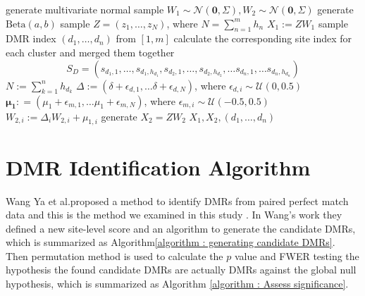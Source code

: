 \documentclass{report}
\begin{document}
\begin{algorithm}
\begin{algorithmic}[1]
           \State generate multivariate normal sample $W_1 \sim \mathcal{N}( \mathbf{0}, \Sigma), W_2 \sim \mathcal{N}(\mathbf{0}, \Sigma)$
           \State generate $\mathrm{Beta}(a,b)$ sample $Z = (z_1, \ldots, z_{N})$, where $N = \sum_{n=1}^m h_n$
           \State $X_1 := Z W_1$ 
           \State sample DMR index $(d_1, \ldots, d_n)$ from $[1,m]$
           \State calculate the corresponding site index for each cluster and merged them together
            \[ 
             S_D = (s_{d_1,1}, \ldots, s_{d_1, h_{d_1}}, s_{d_2,1}, \ldots, s_{d_2, h_{d_2}} ,\ldots s_{d_n,1}, \ldots s_{d_n, h_{d_n}} )
             \]
            \State $N := \sum_{k=1}^n h_{d_k}$ 
            \State $\Delta := (\delta + \epsilon_{d,1}, \ldots \delta + \epsilon_{d,N})$, 
             where $\epsilon_{d,i} \sim \mathcal{U}(0,0.5)$ 
            \State $\boldsymbol{\mu_1} : = (\mu_1 + \epsilon_{m,1}, \ldots \mu_1 + \epsilon_{m,N})$, 
            where $\epsilon_{m,i} \sim \mathcal{U}(-0.5,0.5)$ 
           \State $W_{2,i} := \Delta_i W_{2,i} + \mu_{1,i}$  
            \EndFor
            \State generate $X_2 = Z W_2$
       \State \Return $X_1, X_2, (d_1,\ldots,d_n)$
       \end{algorithmic}
   \end{algorithm}
   
   \section{DMR Identification Algorithm }
    \par
   Wang Ya et al.proposed a method to identify DMRs from paired perfect match data and this is the method we examined in this study \cite{wang2017accounting}.
   In Wang's work they defined a new site-level score and an algorithm to generate the candidate DMRs, which is summarized as Algorithm\ref{algorithm : generating candidate DMRs}.  Then permutation method is used to calculate
   the $p$ value and FWER testing the hypothesis the found candidate DMRs are actually DMRs against the global null hypothesis, which is summarized as Algorithm \ref{algorithm : Assess significance}.
    
\end{document}
